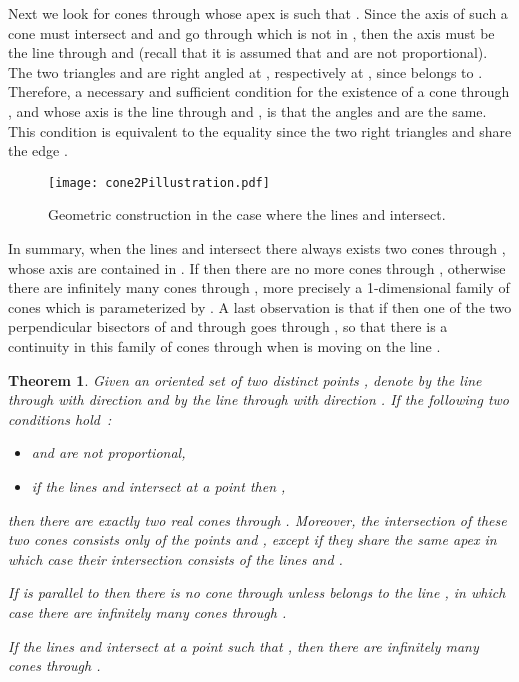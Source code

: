 \documentclass[5p]{elsarticle}
\newtheorem{thm}{Theorem}
\newcommand{\com}[1]{{\color{black} #1}}
\newcommand{\lb}[1]{{\color{black} #1}}
\begin{document}
\lb{Next we look} for cones through  \lb{whose} apex  is such that .  Since the axis of such a cone must intersect  and  and go through  which is not in , then \com{the axis} must be the line through  and  (recall that it is assumed that  and  are not proportional). 
\com{The two triangles  and  are right angled at , respectively at , since  belongs to . Therefore, a necessary and sufficient condition for the existence of a cone through , and whose axis is the line through  and , is that the angles  and  are the same. This condition is equivalent to the equality  since the two right triangles  and  share the edge .
}



 \begin{figure}
	\hspace{-1.5em}
	\texttt{[image: cone2Pillustration.pdf]}
    \caption{Geometric construction in the case where the lines  and  intersect.}\label{fig:schema}
 \end{figure}

In summary, when the lines  and  intersect there always exists two cones through , whose axis are contained in . If  then there are no more cones through , otherwise there are infinitely many cones through , more precisely a 1-dimensional family of cones which is parameterized by . A last observation is that if  then \com{one of the two} perpendicular bisectors of  and  through  goes through , so that there is a continuity in this family of cones through  when  is moving on the line .


\begin{thm} \lb{Given} an oriented set of two distinct points \lb{, denote} by  the line through  with direction  and by  the line through  with direction .
	If the \lb{following two} conditions \lb{hold~:}
	\begin{itemize}
		\item[i)]  and  are not proportional, 
		\item[ii)] if the lines  and  intersect at a point  then ,
	\end{itemize}
then there are exactly two real cones through . Moreover, the intersection of these two cones consists only of the points  and , except if they share the same apex in which case their intersection consists of the lines  and .  
	
	If  is parallel to  then there is no cone through  unless  belongs to the \lb{line} , in which case there are infinitely many cones through .
	
	If the lines  and  intersect at a point  such that , then there are infinitely many cones through .
\end{thm}
\end{document}
